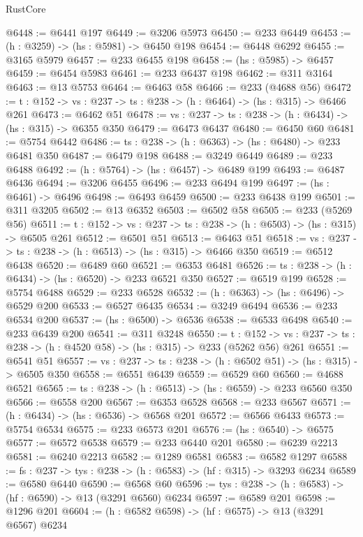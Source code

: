 \begin{lexlean}{RustCore}
\begin{coremodule}
@6448 := @6441 @197
@6449 := @3206 @5973
@6450 := @233 @6449
@6453 := (h : @3259) -> (hs : @5981) -> @6450 @198
@6454 := @6448 @6292
@6455 := @3165 @5979
@6457 := @233 @6455 @198
@6458 := (hs : @5985) -> @6457
@6459 := @6454 @5983
@6461 := @233 @6437 @198
@6462 := @311 @3164
@6463 := @13 @5753
@6464 := @6463 @58
@6466 := @233 (@4688 @56)
@6472 := {t : @152} -> {vs : @237} -> {ts : @238} -> (h : @6464) -> (hs : @315) -> @6466 @261
@6473 := @6462 @51
@6478 := {vs : @237} -> {ts : @238} -> (h : @6434) -> (hs : @315) -> @6355 @350
@6479 := @6473 @6437
@6480 := @6450 @60
@6481 := @5754 @6442
@6486 := {ts : @238} -> (h : @6363) -> (hs : @6480) -> @233 @6481 @350
@6487 := @6479 @198
@6488 := @3249 @6449
@6489 := @233 @6488
@6492 := (h : @5764) -> (hs : @6457) -> @6489 @199
@6493 := @6487 @6436
@6494 := @3206 @6455
@6496 := @233 @6494 @199
@6497 := (hs : @6461) -> @6496
@6498 := @6493 @6459
@6500 := @233 @6438 @199
@6501 := @311 @3205
@6502 := @13 @6352
@6503 := @6502 @58
@6505 := @233 (@5269 @56)
@6511 := {t : @152} -> {vs : @237} -> {ts : @238} -> (h : @6503) -> (hs : @315) -> @6505 @261
@6512 := @6501 @51
@6513 := @6463 @51
@6518 := {vs : @237} -> {ts : @238} -> (h : @6513) -> (hs : @315) -> @6466 @350
@6519 := @6512 @6438
@6520 := @6489 @60
@6521 := @6353 @6481
@6526 := {ts : @238} -> (h : @6434) -> (hs : @6520) -> @233 @6521 @350
@6527 := @6519 @199
@6528 := @5754 @6488
@6529 := @233 @6528
@6532 := (h : @6363) -> (hs : @6496) -> @6529 @200
@6533 := @6527 @6435
@6534 := @3249 @6494
@6536 := @233 @6534 @200
@6537 := (hs : @6500) -> @6536
@6538 := @6533 @6498
@6540 := @233 @6439 @200
@6541 := @311 @3248
@6550 := {t : @152} ->
  {vs : @237} -> {ts : @238} -> (h : @4520 @58) -> (hs : @315) -> @233 (@5262 @56) @261
@6551 := @6541 @51
@6557 := {vs : @237} -> {ts : @238} -> (h : @6502 @51) -> (hs : @315) -> @6505 @350
@6558 := @6551 @6439
@6559 := @6529 @60
@6560 := @4688 @6521
@6565 := {ts : @238} -> (h : @6513) -> (hs : @6559) -> @233 @6560 @350
@6566 := @6558 @200
@6567 := @6353 @6528
@6568 := @233 @6567
@6571 := (h : @6434) -> (hs : @6536) -> @6568 @201
@6572 := @6566 @6433
@6573 := @5754 @6534
@6575 := @233 @6573 @201
@6576 := (hs : @6540) -> @6575
@6577 := @6572 @6538
@6579 := @233 @6440 @201
@6580 := @6239 @2213
@6581 := @6240 @2213
@6582 := @1289 @6581
@6583 := @6582 @1297
@6588 := {fs : @237} -> {tys : @238} -> (h : @6583) -> (hf : @315) -> @3293 @6234
@6589 := @6580 @6440
@6590 := @6568 @60
@6596 := {tys : @238} -> (h : @6583) -> (hf : @6590) -> @13 (@3291 @6560) @6234
@6597 := @6589 @201
@6598 := @1296 @201
@6604 := (h : @6582 @6598) -> (hf : @6575) -> @13 (@3291 @6567) @6234

\end{coremodule}
\end{lexlean}
